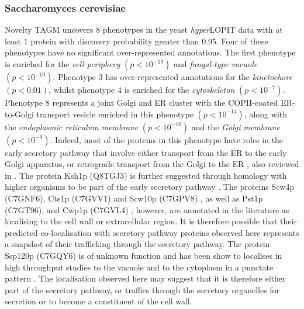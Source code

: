 \documentclass[12pt,english]{article}
\begin{document}
 \subsubsection{Saccharomyces cerevisiae}
Novelty TAGM uncovers $8$ phenotypes in the yeast \textit{hyper}LOPIT data with at least $1$ protein with discovery probability greater than $0.95$. Four of these phenotypes have no significant over-represented annotations. The first phenotype is enriched for the \textit{cell periphery} $(p < 10^{-19})$ and \textit{fungal-type vacuole} $(p < 10^{-10})$. Phenotype $3$ has over-represented annotations for the \textit{kinetochore} $(p < 0.01)$, whilst phenotype $4$ is enriched for the \textit{cytoskeleton} $(p < 10^{-7})$. Phenotype $8$ represents a joint Golgi and ER cluster with the COPII-coated ER-to-Golgi transport vesicle enriched in this phenotype $(p < 10^{-14})$, along with the \textit{endoplasmic reticulum membrane} $(p < 10^{-10})$ and the \textit{Golgi membrane} $(p < 10^{-9})$. Indeed, most of the proteins in this phenotype have roles in the early secretory pathway that involve either transport from the ER to the early Golgi apparatus, or retrograde transport from the Golgi to the ER \citep{Bue:2006,Inadome:2005, Otte:2001, Yofe:2016}, also reviewed in \citep{Delic:2013}. The protein Ksh1p (Q8TGJ3) is further suggested through homology with higher organisms to be part of the early secretory pathway \citep{Wendler:2010}. The proteins Scw4p (C7GNF6), Cts1p (C7GVV1) and Scw10p (C7GPV8) \citep{Cappellaro:1998}, as well as Pst1p (C7GT96)\citep{Pardo:2004}, and Cwp1p (C7GVL4) \citep{Yin:2005}, however, are annotated in the literature as localising to the cell wall or extracellular region. It is therefore possible that their predicted co-localisation with secretory pathway proteins observed here represents a snapshot of their trafficking through the secretory pathway. The protein Ssp120p (C7GQY6) is of unknown function and has been show to localises in high throughput studies to the vacuole \citep{Yofe:2016} and to the cytoplasm in a punctate pattern \citep{Huh:2003}. The localisation observed here may suggest that it is therefore either part of the secretory pathway, or traffics through the secretory organelles for secretion or to become a constituent of the cell wall. 
 
\end{document}
